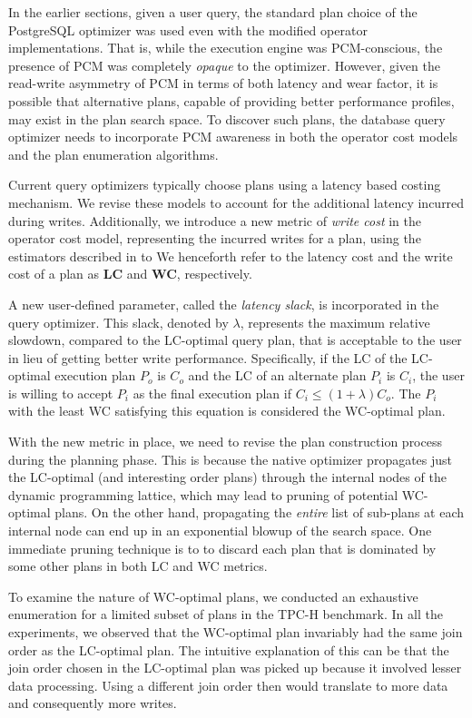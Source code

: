 \documentclass[10pt]{article}
\begin{document}
\label{discussion}

In the earlier sections, given a user query, the standard plan choice
of the PostgreSQL optimizer was used even with the modified operator
implementations. That is, while the execution engine was PCM-conscious,
the presence of PCM was completely \emph{opaque} to the optimizer.
However, given the read-write asymmetry of PCM in terms of both latency and wear
factor, it is possible that alternative plans, capable of providing better
performance profiles, may exist in the plan search space. To discover
such plans, the database query optimizer needs to incorporate PCM
awareness in both the operator cost models and the plan enumeration
algorithms.

Current query optimizers typically choose plans using a latency based
costing mechanism. We revise these models to account for the additional
latency incurred during writes. Additionally, we introduce a new metric of
\emph{write cost} in the operator cost model, representing the incurred
writes for a plan, using the estimators described in 
to 
We henceforth refer to the latency cost and the write cost
of a plan as \textbf{LC} and \textbf{WC}, respectively.

A new user-defined parameter, called the \emph{latency slack}, is
incorporated in the query optimizer.  This slack, denoted by $\lambda$,
represents the maximum relative slowdown, compared to the LC-optimal
query plan, that is acceptable to the user in lieu of getting better
write performance. Specifically, if the LC of the LC-optimal execution
plan $P_o$ is $C_o$ and the LC of an alternate plan $P_i$ is $C_i$, the
user is willing to accept $P_i$ as the final execution plan if $C_i \le
(1+\lambda) C_o$. The $P_i$ with the least WC satisfying this equation
is considered the WC-optimal plan.

With the new metric in place, we need to revise the plan construction process during the planning phase. This is because the native optimizer
propagates just the LC-optimal (and interesting order plans) through
the internal nodes of the dynamic programming lattice, which may lead
to pruning of potential WC-optimal plans. On the other hand, propagating
the \emph{entire} list of sub-plans at each internal node can end up in
an exponential blowup of the search space. One immediate pruning technique is to to discard each plan that is dominated by some other plans in both LC and WC metrics.

To examine the nature of WC-optimal plans, we conducted an exhaustive enumeration for a limited subset of plans in the TPC-H benchmark. In all the experiments, we observed that the WC-optimal plan invariably had the same join order as the LC-optimal plan. The intuitive explanation of this can be that the join order chosen in the LC-optimal plan was picked up because it involved lesser data processing. Using a different join order then would translate to more data and consequently more writes.
\end{document}
